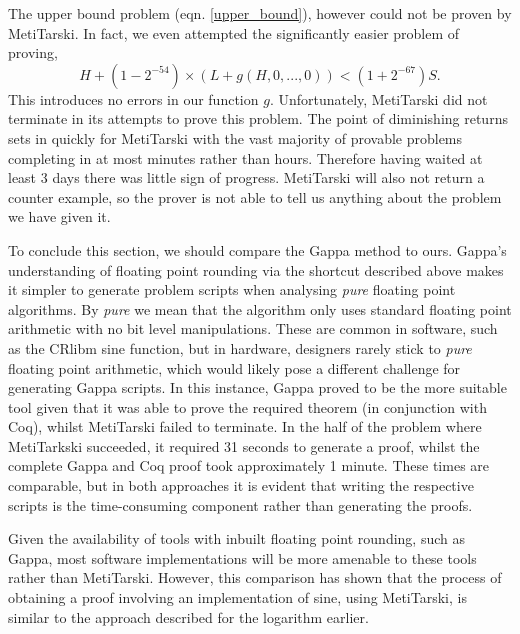 \documentclass{fac}
\begin{document}
The upper bound problem (eqn. \ref{upper_bound}), however could not be proven by MetiTarski. In fact, we even attempted the significantly easier problem of proving,
\begin{equation}
    H + (1-2^{-54})\times(L+g(H,0,...,0)) < (1+2^{-67})S.
\end{equation}
This introduces no errors in our function $g$. Unfortunately, MetiTarski did not terminate in its attempts to prove this problem. The point of diminishing returns sets in quickly for MetiTarski with the vast majority of provable problems completing in at most minutes rather than hours. Therefore having waited at least 3 days there was little sign of progress. MetiTarski will also not return a counter example, so the prover is not able to tell us anything about the problem we have given it. 

To conclude this section, we should compare the Gappa method to ours. Gappa's understanding of floating point rounding via the shortcut described above makes it simpler to generate problem scripts when analysing \textit{pure} floating point algorithms. By \textit{pure} we mean that the algorithm only uses standard floating point arithmetic with no bit level manipulations. These are common in software, such as the CRlibm sine function, but in hardware, designers rarely stick to \textit{pure} floating point arithmetic, which would likely pose a different challenge for generating Gappa scripts. In this instance, Gappa proved to be the more suitable tool given that it was able to prove the required theorem (in conjunction with Coq), whilst MetiTarski failed to terminate. In the half of the problem where MetiTarkski succeeded, it required 31 seconds to generate a proof, whilst the complete Gappa and Coq proof took approximately 1 minute. These times are comparable, but in both approaches it is evident that writing the respective scripts is the time-consuming component rather than generating the proofs.

Given the availability of tools with inbuilt floating point rounding, such as Gappa, most software implementations will be more amenable to these tools rather than MetiTarski. However, this comparison has shown that the process of obtaining a proof involving an implementation of sine, using MetiTarski, is similar to the approach described for the logarithm earlier. 

\end{document}
